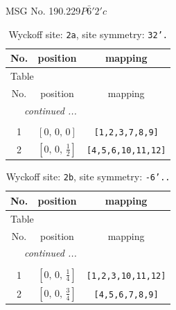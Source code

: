 \documentclass[fleqn,8pt]{jsarticle}
\begin{document}
\setcounter{MaxMatrixCols}{32}

\renewcommand{\tablename}{Table~}
\renewcommand{\figurename}{Figure~}
\begin{center}
\LARGE
MSG No. 190.229\quad$P\bar{6}'2'c$
\end{center}
\renewcommand{\arraystretch}{1.2}
\begin{longtable}{ccc}
\caption{Wyckoff site: {\tt 2a}, site symmetry: {\tt 32'.}}
 \\
 \hline \hline
No. & position & mapping \\ \hline \endfirsthead

\multicolumn{2}{l}{\tablename\ \thetable{}} \\
 \hline \hline
No. & position & mapping \\ \hline \endhead

 \hline \hline
\multicolumn{2}{r}{\footnotesize\it continued ...} \\ \endfoot

 \hline \hline
\multicolumn{2}{r}{} \\ \endlastfoot

1 & $\left[ 0,\, 0,\, 0 \right]$ & {\tt [1,2,3,7,8,9]} \\ \hline
2 & $\left[ 0,\, 0,\, \frac{1}{2} \right]$ & {\tt [4,5,6,10,11,12]} \\
\end{longtable}
\renewcommand{\arraystretch}{1.2}
\begin{longtable}{ccc}
\caption{Wyckoff site: {\tt 2b}, site symmetry: {\tt -6'..}}
 \\
 \hline \hline
No. & position & mapping \\ \hline \endfirsthead

\multicolumn{2}{l}{\tablename\ \thetable{}} \\
 \hline \hline
No. & position & mapping \\ \hline \endhead

 \hline \hline
\multicolumn{2}{r}{\footnotesize\it continued ...} \\ \endfoot

 \hline \hline
\multicolumn{2}{r}{} \\ \endlastfoot

1 & $\left[ 0,\, 0,\, \frac{1}{4} \right]$ & {\tt [1,2,3,10,11,12]} \\ \hline
2 & $\left[ 0,\, 0,\, \frac{3}{4} \right]$ & {\tt [4,5,6,7,8,9]} \\
\end{longtable}
\end{document}
